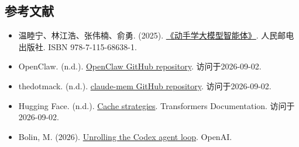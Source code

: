\FloatBarrier
{}
\hypertarget{ux53c2ux8003ux6587ux732e-126}{%
\subsection{参考文献}\label{ux53c2ux8003ux6587ux732e-126}}

\vspace{0.25em}
\begin{itemize}
\tightlist
\item
  温睦宁、林江浩、张伟楠、俞勇. (2025). \href{https://haa.boyuai.com/}{《动手学大模型智能体》}. 人民邮电出版社. ISBN 978-7-115-68638-1.
\item
  OpenClaw. (n.d.). \href{https://github.com/openclaw/openclaw}{OpenClaw GitHub repository}. 访问于2026-09-02.
\item
  thedotmack. (n.d.). \href{https://github.com/thedotmack/claude-mem}{claude-mem GitHub repository}. 访问于2026-09-02.
\item
  Hugging Face. (n.d.). \href{https://huggingface.co/docs/transformers/main/kv_cache}{Cache strategies}. Transformers Documentation. 访问于2026-09-02.
\item
  Bolin, M. (2026). \href{https://openai.com/index/unrolling-the-codex-agent-loop/}{Unrolling the Codex agent loop}. OpenAI.
\end{itemize}

\clearpage
